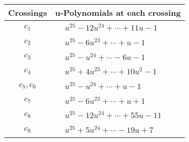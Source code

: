 \documentclass[1p]{elsarticle_modified}
\theoremstyle{definition}
\begin{document}
\begin{tabular}{m{50pt}|m{274pt}}
Crossings & \hspace{64pt}u-Polynomials at each crossing \\
\hline $$\begin{aligned}c_{1}\end{aligned}$$&$\begin{aligned}
&u^{25}-12 u^{24}+\cdots+11 u-1
\end{aligned}$\\
\hline $$\begin{aligned}c_{2}\end{aligned}$$&$\begin{aligned}
&u^{25}-6 u^{23}+\cdots+u-1
\end{aligned}$\\
\hline $$\begin{aligned}c_{3}\end{aligned}$$&$\begin{aligned}
&u^{25}- u^{24}+\cdots-6 u-1
\end{aligned}$\\
\hline $$\begin{aligned}c_{4}\end{aligned}$$&$\begin{aligned}
&u^{25}+4 u^{23}+\cdots+10 u^2-1
\end{aligned}$\\
\hline $$\begin{aligned}c_{5},c_{6}\end{aligned}$$&$\begin{aligned}
&u^{25}- u^{24}+\cdots+u-1
\end{aligned}$\\
\hline $$\begin{aligned}c_{7}\end{aligned}$$&$\begin{aligned}
&u^{25}-6 u^{23}+\cdots+u+1
\end{aligned}$\\
\hline $$\begin{aligned}c_{8}\end{aligned}$$&$\begin{aligned}
&u^{25}-12 u^{24}+\cdots+55 u-11
\end{aligned}$\\
\hline $$\begin{aligned}c_{9}\end{aligned}$$&$\begin{aligned}
&u^{25}+5 u^{24}+\cdots-19 u+7
\end{aligned}$\\

\end{tabular}
\end{document}
